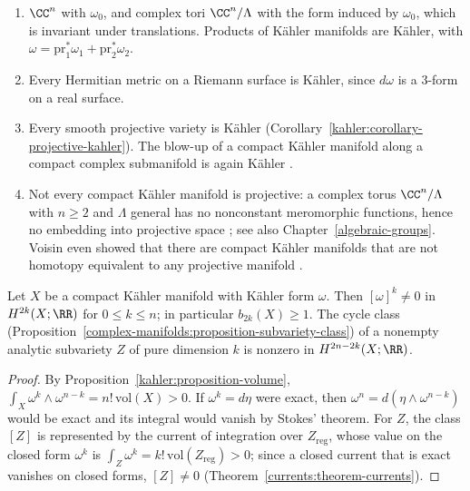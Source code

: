 \begin{example}\label{kahler:example-kahler}
\begin{enumerate}
\item $\CC^n$ with $\omega_0$, and complex tori $\CC^n/\Lambda$ with the form induced by $\omega_0$, which is invariant under translations. Products
of K\"ahler manifolds are K\"ahler, with $\omega = \mathrm{pr}_1^*\omega_1 + \mathrm{pr}_2^*\omega_2$.
\item Every Hermitian metric on a Riemann surface is K\"ahler, since $d\omega$ is a $3$-form on a real surface.
\item Every smooth projective variety is K\"ahler (Corollary~\ref{kahler:corollary-projective-kahler}). The blow-up of a compact K\"ahler
manifold along a compact complex submanifold is again K\"ahler \cite[Chapter 3]{voisin-hodge-1}.
\item Not every compact K\"ahler manifold is projective: a complex torus $\CC^n/\Lambda$ with $n \geq 2$ and $\Lambda$ general has no
nonconstant meromorphic functions, hence no embedding into projective space \cite{birkenhake-lange}; see also Chapter~\ref{algebraic-groups}. Voisin even showed that there
are compact K\"ahler manifolds that are not homotopy equivalent to any projective manifold \cite{voisin-kodaira}.
\end{enumerate}
\end{example}

\begin{proposition}\label{kahler:proposition-kahler-class-powers}
Let $X$ be a compact K\"ahler manifold with K\"ahler form $\omega$. Then $[\omega]^k \neq 0$ in $H^{2k}(X; \RR)$ for $0 \leq k \leq n$; in
particular $b_{2k}(X) \geq 1$. The cycle class (Proposition~\ref{complex-manifolds:proposition-subvariety-class}) of a nonempty analytic
subvariety $Z$ of pure dimension $k$ is nonzero in $H^{2n-2k}(X; \RR)$.
\end{proposition}

\begin{proof}
By Proposition~\ref{kahler:proposition-volume}, $\int_X\omega^k \wedge \omega^{n-k} = n!\,\mathrm{vol}(X) > 0$. If $\omega^k = d\eta$ were
exact, then $\omega^n = d(\eta \wedge \omega^{n-k})$ would be exact and its integral would vanish by Stokes' theorem. For $Z$, the class
$[Z]$ is represented by the current of integration over $Z_{\mathrm{reg}}$, whose value on the closed form $\omega^k$ is
$\int_Z\omega^k = k!\,\mathrm{vol}(Z_{\mathrm{reg}}) > 0$; since a closed current that is exact vanishes on closed forms, $[Z] \neq 0$
(Theorem~\ref{currents:theorem-currents}).
\end{proof}

